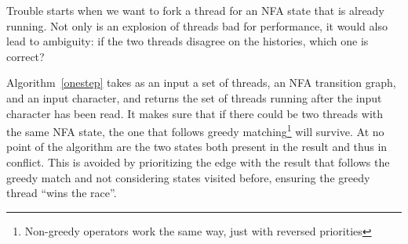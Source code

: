 \documentclass[english]{sigplanconf}
\theoremstyle{definition}
\begin{document}
Trouble starts when we want to fork a thread for an NFA state that
is already running. Not only is an explosion of threads bad for
performance, it would also lead to ambiguity: if the two threads
disagree on the histories, which one is correct?

Algorithm~\ref{onestep}  takes as an input a set of threads, an NFA
transition graph, and an input character, and returns the set of threads
running after the input character has been read. It makes sure that
if there could be two threads with the same NFA state, the one that
follows greedy matching\footnote{Non-greedy operators work the same way, just
with reversed priorities} will survive. At no point of the algorithm are the
two states both present in the result and thus in conflict. This is avoided
by prioritizing the edge with the result that follows the greedy match and
not considering states visited before, ensuring the greedy thread 
``wins the race''.
\end{document}

